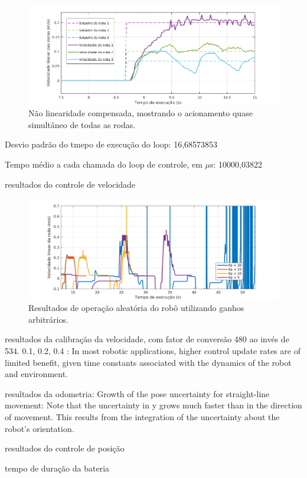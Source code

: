 \begin{figure}[h]
  \centering
  \includegraphics[width = \textwidth]{imagens/zmcomp}
  \caption{Não linearidade compensada, mostrando o acionamento quase simultâneo de todas as rodas.}
  \label{fig:zm_comp}
\end{figure}

Desvio padrão do tmepo de execução do loop: 16,68573853

Tempo médio a cada chamada do loop de controle, em $\mu$s: 10000,03822

resultados do controle de velocidade

\begin{figure}[h]
  \centering
  \includegraphics[width = \textwidth]{imagens/inst}
  \caption{Resultados de operação aleatória do robô utilizando ganhos arbitrários.}
  \label{fig:inst}
\end{figure}

resultados da calibração da velocidade, com fator de conversão 480 ao invés de 534.
0.1, 0.2, 0.4
\citet{lynch2017modern}: In most robotic applications, higher control update rates are of limited benefit, given
time constants associated with the dynamics of the robot and environment.

resultados da odometria:
Growth of the pose uncertainty for straight-line movement: Note that the uncertainty in y grows much
faster than in the direction of movement. This results from the integration of the uncertainty about the
robot’s orientation. \citep{siegwart2011introduction}

resultados do controle de posição

tempo de duração da bateria
